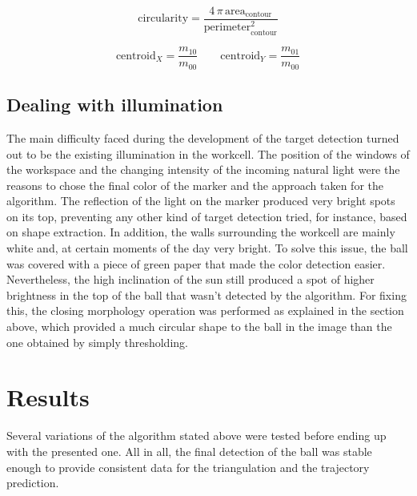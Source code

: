 \begin{equation}
\mathrm{circularity} = \frac{4 \, \pi \, \mathrm{area}_\mathrm{contour}}{\mathrm{perimeter}_\mathrm{contour}^{2}}
\label{eq:circularity}
\end{equation}

\begin{equation}
\mathrm{centroid}_{X} = \frac{m_{10}}{m_{00}} \qquad \mathrm{centroid}_{Y}=\frac{m_{01}}{m_{00}}
\label{eq:centroids}
\end{equation}

\subsection{Dealing with illumination}
The main difficulty faced during the development of the target detection turned out to be the existing illumination in the workcell.
The position of the windows of the workspace and the changing intensity of the incoming natural light were the reasons to chose the final color of the marker and the approach taken for the algorithm.
The reflection of the light on the marker produced very bright spots on its top, preventing any other kind of target detection tried, for instance, based on shape extraction.
In addition, the walls surrounding the workcell are mainly white and, at certain moments of the day very bright.
To solve this issue, the ball was covered with a piece of green paper that made the color detection easier. Nevertheless, the high inclination of the sun still produced a spot of higher brightness in the top of the ball that wasn't detected by the algorithm. For fixing this, the closing morphology operation was performed as explained in the section above, which provided a much circular shape to the ball in the image than the one obtained by simply thresholding.

\section{Results}
Several variations of the algorithm stated above were tested before ending up with the presented one.
All in all, the final detection of the ball was stable enough to provide consistent data for the triangulation and the trajectory prediction.


